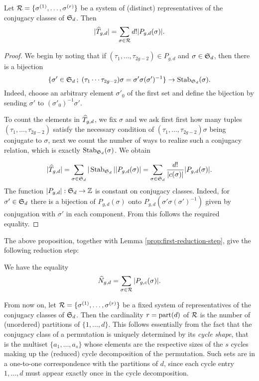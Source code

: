 \begin{prop}
 Let $\mathcal{R}=\{\sigma^{(1)},\dotsc,\sigma^{(r)}\}$ be a system of (distinct) representatives of the conjugacy classes of $\operatorname{\mathfrak{S}}_d$. Then \[|\widehat{T}_{g,d}|=\sum_{\sigma\in\mathcal{R}}d!|P_{g,d}(\sigma)|.\]
\end{prop}
\begin{proof}
 We begin by noting that if $(\tau_1,\dotsc,\tau_{2g-2})\in P_{g,d}$ and $\sigma\in\operatorname{\mathfrak{S}}_d$, then there is a bijection
 \[
  \{\sigma'\in\operatorname{\mathfrak{S}}_d\,;\; (\tau_1 \dotsm \tau_{2g-2})\sigma=\sigma'\sigma(\sigma')^{-1}\} \to
  \operatorname{Stab}_{\operatorname{\mathfrak{S}}_d}(\sigma).
 \]
 Indeed, choose an arbitrary element $\sigma'_0$ of the first set and define the bijection by sending $\sigma'$ to $(\sigma'_0)^{-1}\sigma'$.
 
 To count the elements in $\widehat{T}_{g,d}$, we fix $\sigma$ and we ask first first how many tuples $(\tau_1,\dotsc,\tau_{2g-2})$ satisfy the necessary condition of $(\tau_1,\dotsc,\tau_{2g-2})\sigma$ being conjugate to $\sigma$, next we count the number of ways to realize such a conjugacy relation, which is exactly $\operatorname{Stab}_{\operatorname{\mathfrak{S}}_d}(\sigma)$. We obtain
 
 \[
  |\widehat{T}_{g,d}|=\sum_{\sigma\in\operatorname{\mathfrak{S}}_d}|\operatorname{Stab}_{\operatorname{\mathfrak{S}}_d}||P_{g,d}(\sigma)|=\sum_{\sigma\in\operatorname{\mathfrak{S}}_d}\frac{d!}{|c(\sigma)|}|P_{g,d}(\sigma)|.
 \]
The function $|P_{g,d}|:\operatorname{\mathfrak{S}}_d\to\mathbb{Z}$ is constant on conjugacy classes. Indeed, for $\sigma'\in\operatorname{\mathfrak{S}}_d$ there is a bijection of $P_{g,d}(\sigma)$ onto $P_{g,d}(\sigma'\sigma(\sigma')^{-1})$ given by conjugation with $\sigma'$ in each component. From this follows the required equality.
\end{proof}
The above proposition, together with Lemma \ref{prop:first-reduction-step}, give the following reduction step:
\begin{cor} \label{prop:first-second-reduction-step}
  We have the equality
 \[
  \widehat{N}_{g,d}=\sum_{\sigma\in\mathcal{R}}|P_{g,c}(\sigma)|.
 \]
\end{cor}

From now on, let $\mathcal{R}=\{\sigma^{(1)},\dotsc,\sigma^{(r)}\}$ be a fixed system of representatives of the conjugacy classes of $\operatorname{\mathfrak{S}}_d$. Then the cardinality $r=\operatorname{part}(d)$ of $\mathcal{R}$ is the number of (unordered) partitions of $\{1,\dotsc,d\}$. This follows essentially from the fact that the conjugacy class of a permutation is uniquely determined by its \emph{cycle shape}, that is the multiset $\{a_{1},\dotsc,a_{s}\}$ whose elements are the respective sizes of the $s$ cycles making up the (reduced) cycle decomposition of the permutation. Such sets are in a one-to-one correspondence with the partitions of $d$, since each cycle entry $1,\dotsc,d$ must appear exactly once in the cycle decomposition.

